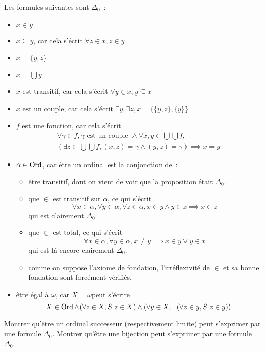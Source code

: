 \begin{example}
  Les formules suivantes sont $\Delta_0$~:
  \begin{itemize}
  \item $x\in y$
  \item $x\subseteq y$, car cela s'écrit $\forall z \in x, z \in y$
  \item $x = \{y,z\}$
  \item $x = \bigcup y$
  \item $x$ est transitif, car cela s'écrit $\forall y \in x, y\subseteq x$
  \item $x$ est un couple, car cela s'écrit
    $\exists y,\exists z, x = \{\{y,z\},\{y\}\}$
  \item $f$ est une fonction, car cela s'écrit
    \begin{multline*}
      \forall \gamma \in f, \gamma\text{ est un couple }\land
      \forall x,y \in \bigcup \bigcup f,\\
      (\exists z \in \bigcup\bigcup f,
      (x,z) = \gamma \land (y,z) = \gamma) \implies x = y
    \end{multline*}
  \item $\alpha \in \operatorname{Ord}$, car être un ordinal est la conjonction de~:
    \begin{itemize}
    \item être transitif, dont on vient de voir que la proposition était
      $\Delta_0$.
    \item que $\in$ est transitif sur $\alpha$, ce qui s'écrit
      \[\forall x \in \alpha, \forall y \in \alpha, \forall z \in \alpha,
      x\in y \land y \in z \implies x \in z\] qui est clairement $\Delta_0$.
    \item que $\in$ est total, ce qui s'écrit
      \[\forall x \in \alpha, \forall y \in \alpha, x \neq y \implies
      x \in y \lor y \in x\] qui est là encore clairement $\Delta_0$.
    \item comme on suppose l'axiome de fondation, l'irréflexivité de $\in$ et sa
      bonne fondation sont forcément vérifiés.
    \end{itemize}
  \item être égal à $\omega$, car \og $X = \omega$\fg peut s'écrire
    \[X\in \operatorname{Ord} \land (\forall z \in X, S\;z \in X) \land
    (\forall y \in X, \lnot (\forall z \in y, S\;z \in y))\]
  \end{itemize}
\end{example}

\begin{exercise}
  Montrer qu'être un ordinal successeur (respectivement limite) peut s'exprimer
  par une formule $\Delta_0$. Montrer qu'être une bijection peut s'exprimer
  par une formule $\Delta_0$.
\end{exercise}

